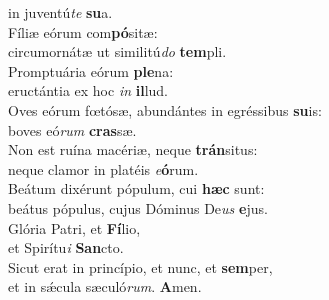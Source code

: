 \oddverse in juventú\textit{te} \textbf{su}a.\\
\evenverse Fíliæ eórum com\textbf{pó}sitæ:~\*\\
\evenverse circumornátæ ut similitú\textit{do} \textbf{tem}pli.\\
\oddverse Promptuária eórum \textbf{ple}na:~\*\\
\oddverse eructántia ex hoc \textit{in} \textbf{il}lud.\\
\evenverse Oves eórum fœtósæ, abundántes in egréssibus \textbf{su}is:~\*\\
\evenverse boves eó\textit{rum} \textbf{cras}sæ.\\
\oddverse Non est ruína macériæ, neque \textbf{trán}situs:~\*\\
\oddverse neque clamor in platéis \textit{e}\textbf{ó}rum.\\
\evenverse Beátum dixérunt pópulum, cui \textbf{hæc} sunt:~\*\\
\evenverse beátus pópulus, cujus Dóminus De\textit{us} \textbf{e}jus.\\
\oddverse Glória Patri, et \textbf{Fí}lio,~\*\\
\oddverse et Spirítu\textit{i} \textbf{San}cto.\\
\evenverse Sicut erat in princípio, et nunc, et \textbf{sem}per,~\*\\
\evenverse et in sǽcula sæculó\textit{rum}. \textbf{A}men.\\
